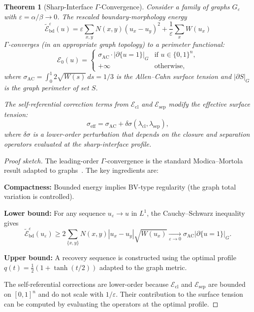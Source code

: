 \documentclass[lettersize,journal]{IEEEtran}
\newtheorem{theorem}{Theorem}
\begin{document}
\begin{theorem}[Sharp-Interface $\Gamma$-Convergence]
\label{thm:gamma}
Consider a family of graphs $G_\varepsilon$ with $\varepsilon = \alpha/\beta \to 0$. The rescaled boundary-morphology energy
\begin{equation}
\widetilde{\mathcal{E}}_{\mathrm{bd}}^\varepsilon(u) = \varepsilon \sum_{x,y} N(x,y)(u_x - u_y)^2 + \frac{1}{\varepsilon}\sum_x W(u_x)
\end{equation}
$\Gamma$-converges (in an appropriate graph topology) to a perimeter functional:
\begin{equation}
\mathcal{E}_0(u) = \begin{cases}
\sigma_{\mathrm{AC}} \cdot |\partial\{u = 1\}|_G & \text{if } u \in \{0,1\}^n,\\
+\infty & \text{otherwise},
\end{cases}
\end{equation}
where $\sigma_{\mathrm{AC}} = \int_0^1 2\sqrt{W(s)}\,ds = 1/3$ is the Allen--Cahn surface tension and $|\partial S|_G$ is the graph perimeter of set $S$.

The self-referential correction terms from $\mathcal{E}_{\mathrm{cl}}$ and $\mathcal{E}_{\mathrm{sep}}$ modify the effective surface tension:
\begin{equation}
\sigma_{\mathrm{eff}} = \sigma_{\mathrm{AC}} + \delta\sigma(\lambda_{\mathrm{cl}}, \lambda_{\mathrm{sep}}),
\end{equation}
where $\delta\sigma$ is a lower-order perturbation that depends on the closure and separation operators evaluated at the sharp-interface profile.
\end{theorem}

\begin{proof}[Proof sketch]
The leading-order $\Gamma$-convergence is the standard Modica--Mortola result adapted to graphs~\cite{vanGennip2012}. The key ingredients are:

\textbf{Compactness:} Bounded energy implies BV-type regularity (the graph total variation is controlled).

\textbf{Lower bound:} For any sequence $u_\varepsilon \to u$ in $L^1$, the Cauchy--Schwarz inequality gives
\[
\widetilde{\mathcal{E}}_{\mathrm{bd}}^\varepsilon(u_\varepsilon) \geq 2\sum_{\{x,y\}} N(x,y)|u_x - u_y|\sqrt{W(u_x)} \xrightarrow[\varepsilon \to 0]{} \sigma_{\mathrm{AC}} |\partial\{u=1\}|_G.
\]

\textbf{Upper bound:} A recovery sequence is constructed using the optimal profile $q(t) = \frac{1}{2}(1 + \tanh(t/2))$ adapted to the graph metric.

The self-referential corrections are lower-order because $\mathcal{E}_{\mathrm{cl}}$ and $\mathcal{E}_{\mathrm{sep}}$ are bounded on $[0,1]^n$ and do not scale with $1/\varepsilon$. Their contribution to the surface tension can be computed by evaluating the operators at the optimal profile.
\end{proof}
\end{document}
